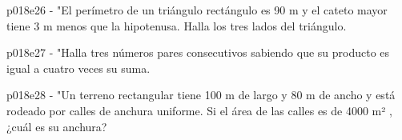\documentclass[spanish, 11pt]{exam}
\begin{document}
\begin{questions}
\begin{multicols}{2}
        \end{multicols}
        \question p018e26 - "El perímetro de un triángulo rectángulo es 90 m y el cateto mayor tiene 3 m menos que 
la hipotenusa. Halla los tres lados del triángulo.
        \begin{multicols}{2} 
        \end{multicols}
        \question p018e27 - "Halla tres números pares consecutivos sabiendo que su 
producto es igual a cuatro veces su suma.
        \begin{multicols}{2} 
        \end{multicols}
        \question p018e28 - "Un terreno rectangular tiene 100 m de largo y 80 m de ancho y está rodeado 
por calles de anchura uniforme.
Si el área de las calles es de 4000 m² , ¿cuál es su anchura?
        \begin{multicols}{2} 

\end{multicols}
\end{questions}
\end{document}
